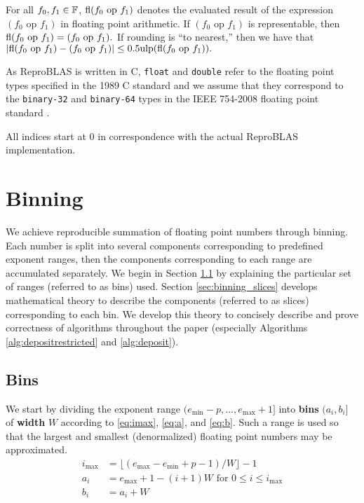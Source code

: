   For all $f_0, f_1 \in \mathbb{F}$, $\text{fl}(f_0 \text{ op } f_1)$ denotes the evaluated
  result of the expression $(f_0 \text{ op } f_1)$ in floating point
  arithmetic. If $(f_0 \text{ op } f_1)$ is representable, then
  \(
    \text{fl}(f_0 \text{ op } f_1) = (f_0 \text{ op } f_1).
  \)
  If rounding is ``to nearest,'' then we have that
  \(
    |\text{fl}(f_0 \text{ op } f_1) - (f_0 \text{ op } f_1)| \leq 0.5\text{ulp}(\text{fl}(f_0 \text{ op } f_1)).
  \)

  As ReproBLAS is written in C, \texttt{float} and \texttt{double} refer to the
  floating point types specified in the 1989 C standard \cite{c89} and we
  assume that they correspond to the \texttt{binary-32} and \texttt{binary-64}
  types in the IEEE 754-2008 floating point standard \cite{ieee754}.

  All indices start at $0$ in correspondence with the actual ReproBLAS implementation.

\section{Binning}
\label{sec:binning}
We achieve reproducible summation of floating point numbers through binning.
Each number is split into several components corresponding to predefined
exponent ranges, then the components corresponding to each range are
accumulated separately. We begin in Section \ref{sec:binning_bins} by
explaining the particular set of ranges (referred to as bins) used. Section
\ref{sec:binning_slices} develops mathematical theory to describe the
components (referred to as slices) corresponding to each bin. We develop this
theory to concisely describe and prove correctness of algorithms throughout the
paper (especially Algorithms \ref{alg:depositrestricted} and
\ref{alg:deposit}).

    \subsection{Bins}
    \label{sec:binning_bins}
    We start by dividing the exponent range $(e_{\min} - p, ..., e_{\max} + 1]$
    into \textbf{bins} $(a_i, b_i]$ of \textbf{width} $W$ according to
    \eqref{eq:imax}, \eqref{eq:a}, and \eqref{eq:b}. Such a range is used so
    that the largest and smallest (denormalized) floating point numbers may be
    approximated.
    \begin{align}
        i_{\max} & = \bigl\lfloor(e_{\max} - e_{\min} + p - 1)/W\bigr\rfloor - 1
            \label{eq:imax} \\
        a_i & = e_{\max} + 1 - (i + 1)W \text{ for } 0 \leq i \leq i_{\max}
            \label{eq:a} \\
        b_i & = a_i + W
            \label{eq:b}
    \end{align}

